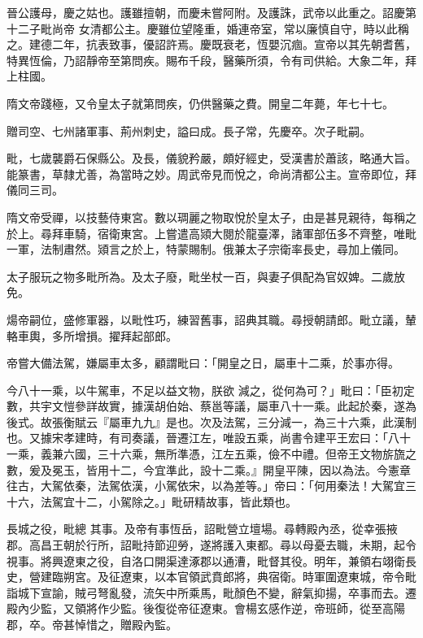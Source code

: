 \begin{pinyinscope}
 晉公護母，慶之姑也。護雖擅朝，而慶未嘗阿附。及護誅，武帝以此重之。詔慶第十二子毗尚帝
 女清都公主。慶雖位望隆重，婚連帝室，常以廉慎自守，時以此稱之。建德二年，抗表致事，優詔許焉。慶既衰老，恆嬰沉痼。宣帝以其先朝耆舊，特異恆倫，乃詔靜帝至第問疾。賜布千段，醫藥所須，令有司供給。大象二年，拜上柱國。



 隋文帝踐極，又令皇太子就第問疾，仍供醫藥之費。開皇二年薨，年七十七。



 贈司空、七州諸軍事、荊州刺史，謚曰成。長子常，先慶卒。次子毗嗣。



 毗，七歲襲爵石保縣公。及長，儀貌矜嚴，頗好經史，受漢書於蕭該，略通大旨。能篆書，草隸尤善，為當時之妙。周武帝見而悅之，命尚清都公主。宣帝即位，拜儀同三司。



 隋文帝受禪，以技藝侍東宮。數以琱麗之物取悅於皇太子，由是甚見親待，每稱之於上。尋拜車騎，宿衛東宮。上嘗遣高熲大閱於龍臺澤，諸軍部伍多不齊整，唯毗一軍，法制肅然。熲言之於上，特蒙賜制。俄兼太子宗衛率長史，尋加上儀同。



 太子服玩之物多毗所為。及太子廢，毗坐杖一百，與妻子俱配為官奴婢。二歲放免。



 煬帝嗣位，盛修軍器，以毗性巧，練習舊事，詔典其職。尋授朝請郎。毗立議，輦輅車輿，多所增損。擢拜起部郎。



 帝嘗大備法駕，嫌屬車太多，顧謂毗曰：「開皇之日，屬車十二乘，於事亦得。



 今八十一乘，以牛駕車，不足以益文物，朕欲
 減之，從何為可？」毗曰：「臣初定數，共宇文愷參詳故實，據漢胡伯始、蔡邕等議，屬車八十一乘。此起於秦，遂為後式。故張衡賦云『屬車九九』是也。次及法駕，三分減一，為三十六乘，此漢制也。又據宋孝建時，有司奏議，晉遷江左，唯設五乘，尚書令建平王宏曰：「八十一乘，義兼六國，三十六乘，無所準憑，江左五乘，儉不中禮。但帝王文物旂旒之數，爰及冕玉，皆用十二，今宜準此，設十二乘。』開皇平陳，因以為法。今憲章往古，大駕依秦，法駕依漢，小駕依宋，以為差等。」帝曰：「何用秦法！大駕宜三十六，法駕宜十二，小駕除之。」毗研精故事，皆此類也。



 長城之役，毗總
 其事。及帝有事恆岳，詔毗營立壇場。尋轉殿內丞，從幸張掖郡。高昌王朝於行所，詔毗持節迎勞，遂將護入東都。尋以母憂去職，未期，起令視事。將興遼東之役，自洛口開渠達涿郡以通漕，毗督其役。明年，兼領右翊衛長史，營建臨朔宮。及征遼東，以本官領武賁郎將，典宿衛。時軍圍遼東城，帝令毗詣城下宣諭，賊弓弩亂發，流矢中所乘馬，毗顏色不變，辭氣抑揚，卒事而去。遷殿內少監，又領將作少監。後復從帝征遼東。會楊玄感作逆，帝班師，從至高陽郡，卒。帝甚悼惜之，贈殿內監。




\end{pinyinscope}

